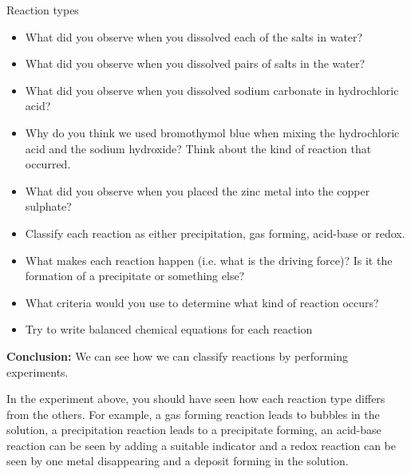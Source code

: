 \begin{g_experiment}{Reaction types}
\begin{itemize}[noitemsep]
            \item What did you observe when you dissolved each of the salts in water?\item What did you observe when you dissolved pairs of salts in the water?\item What did you observe when you dissolved sodium carbonate in hydrochloric acid?\item Why do you think we used bromothymol blue when mixing the hydrochloric acid and the sodium hydroxide? Think about the kind of reaction that occurred.\item What did you observe when you placed the zinc metal into the copper sulphate?\item Classify each reaction as either precipitation, gas forming, acid-base or redox.\item What makes each reaction happen (i.e. what is the driving force)? Is it the formation of a precipitate or something else?\item What criteria would you use to determine what kind of reaction occurs?\item Try to write balanced chemical equations for each reaction\end{itemize}
        \par 
\label{m38719*eip-1904}\noindent{}\textbf{Conclusion: }\newline
    We can see how we can classify reactions by performing experiments. 
\par 
\end{g_experiment}
\label{m38719*eip-761}In the experiment above, you should have seen how each reaction type differs from the others. For example, a gas forming reaction leads to bubbles in the solution, a precipitation reaction leads to a precipitate forming, an acid-base reaction can be seen by adding a suitable indicator and a redox reaction can be seen by one metal disappearing and a deposit forming in the solution.\par  
\label{m38719*eip-796}
